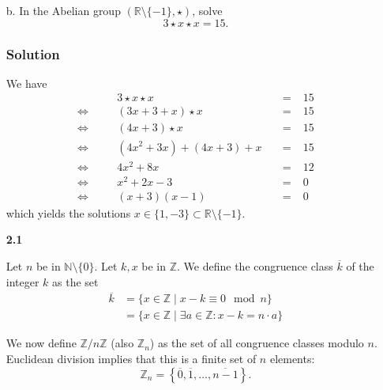 \documentclass[11pt]{article}
\newcommand{\R}{\mathbb{R}}
\newcommand{\Z}{\mathbb{Z}}
\newcommand{\N}{\mathbb{N}}
\newcommand{\cls}[1]{\overline{#1}}                      %
\theoremstyle{definition}
\theoremstyle{plain}
\theoremstyle{remark}
\begin{document}
\begin{enumerate}
    \item[b.] In the Abelian group \(\left(\R \setminus \{-1\}, \star \right)\), solve
          \[
              3 \star x \star x = 15.
          \]

          \subsubsection*{Solution}

          We have
          \[
              \begin{alignedat}{3}
                            &  & 3 \star x \star x          &  & \; = \; & 15 \\
                  \iff\quad &  & (3x + 3 + x) \star x       &  & \; =\;  & 15 \\
                  \iff\quad &  & (4x + 3) \star x           &  & \; =\;  & 15 \\
                  \iff\quad &  & (4x^2 + 3x) + (4x + 3) + x &  & \; =\;  & 15 \\
                  \iff\quad &  & 4x^2 + 8x                  &  & \; =\;  & 12 \\
                  \iff\quad &  & x^2 + 2x -3                &  & \; =\;  & 0  \\
                  \iff\quad &  & (x + 3) (x - 1)            &  & \; =\;  & 0
              \end{alignedat}
          \]
          which yields the solutions \(x \in \{1, -3\} \subset \R \setminus \{-1\}\).

    \item[\textbf{2.1}]

          Let \(n\) be in \(\N \setminus \{0\}\). Let \(k, x\) be in \(\Z\). We define the congruence class \(\cls{k}\) of the
          integer \(k\) as the set
          \[
              \begin{aligned}
                  \cls{k} & = \{ x \in \Z \mid x - k \equiv 0 \mod n \}               \\
                          & = \{ x \in \Z \mid \exists a \in \Z: x - k = n \cdot a \}
              \end{aligned}
          \]

          We now define \(\Z / n\Z\) (also \(\Z_n\)) as the set of all congruence classes modulo \(n\).
          Euclidean division implies that this is a finite set of \(n\) elements:
          \[
              \Z_n = \left \{ \cls{0}, \cls{1}, \ldots, \cls{n - 1} \right \}.
          \]


\end{enumerate}
\end{document}
